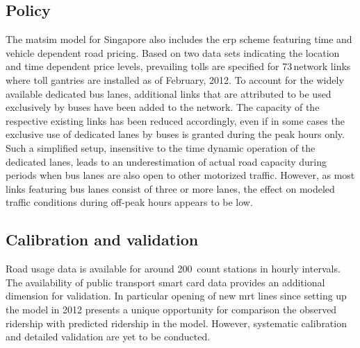 \subsection{Policy}
The \gls{matsim} model for Singapore also includes the \gls{erp} scheme featuring time and vehicle dependent road pricing. Based on two data sets indicating the location and time dependent price levels, prevailing tolls are specified for 73\,network links where toll gantries are installed as of February, 2012. To account for the widely available dedicated bus lanes, additional links that are attributed to be used exclusively by buses have been added to the network. The capacity of the respective existing links has been reduced accordingly, even if in some cases the exclusive use of dedicated lanes by buses is granted during the peak hours only. Such a simplified setup, insensitive to the time dynamic operation of the dedicated lanes, leads to an underestimation of actual road capacity during periods when bus lanes are also open to other motorized traffic. However, as most links featuring bus lanes consist of three or more lanes, the effect on modeled traffic conditions during off-peak hours appears to be low.

\subsection{Calibration and validation}
Road usage data is available for around 200\, 
count stations in hourly intervals. The availability of public transport smart card data provides an additional dimension for validation. In particular opening of new \gls{mrt} lines since setting up the model in 2012 presents a unique opportunity for comparison the observed ridership with predicted ridership in the model. However, systematic calibration and detailed validation are yet to be conducted.

